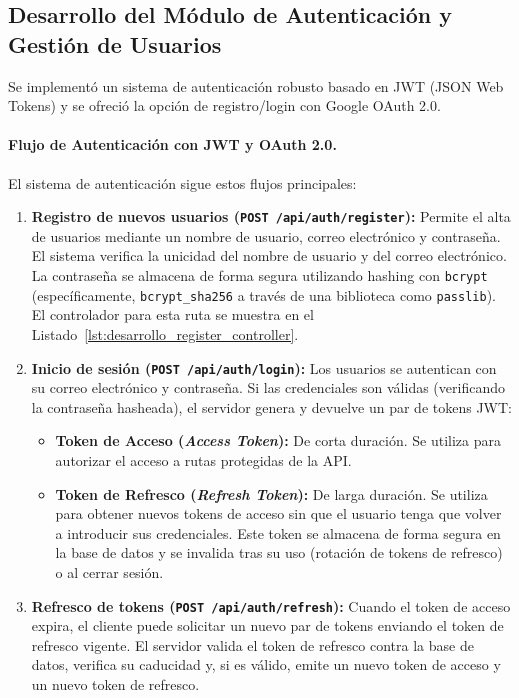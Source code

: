 \subsection{Desarrollo del Módulo de Autenticación y Gestión de Usuarios}
\label{ssec:desarrollo_iter2_auth}

Se implementó un sistema de autenticación robusto basado en JWT (JSON Web Tokens) y se ofreció la opción de registro/login con Google OAuth 2.0.

\paragraph{Flujo de Autenticación con JWT y OAuth 2.0.}
El sistema de autenticación sigue estos flujos principales:
\begin{enumerate}[label=\alph*),leftmargin=*]
  \item \textbf{Registro de nuevos usuarios (\texttt{POST /api/auth/register}):} Permite el alta de usuarios mediante un nombre de usuario, correo electrónico y contraseña. El sistema verifica la unicidad del nombre de usuario y del correo electrónico. La contraseña se almacena de forma segura utilizando hashing con \texttt{bcrypt} (específicamente, \texttt{bcrypt\_sha256} a través de una biblioteca como \texttt{passlib}). El controlador para esta ruta se muestra en el Listado~\ref{lst:desarrollo_register_controller}.

  \item \textbf{Inicio de sesión (\texttt{POST /api/auth/login}):} Los usuarios se autentican con su correo electrónico y contraseña. Si las credenciales son válidas (verificando la contraseña hasheada), el servidor genera y devuelve un par de tokens JWT:
        \begin{itemize}
            \item \textbf{Token de Acceso (\emph{Access Token}):} De corta duración. Se utiliza para autorizar el acceso a rutas protegidas de la API.
            \item \textbf{Token de Refresco (\emph{Refresh Token}):} De larga duración. Se utiliza para obtener nuevos tokens de acceso sin que el usuario tenga que volver a introducir sus credenciales. Este token se almacena de forma segura en la base de datos y se invalida tras su uso (rotación de tokens de refresco) o al cerrar sesión.
        \end{itemize}

  \item \textbf{Refresco de tokens (\texttt{POST /api/auth/refresh}):} Cuando el token de acceso expira, el cliente puede solicitar un nuevo par de tokens enviando el token de refresco vigente. El servidor valida el token de refresco contra la base de datos, verifica su caducidad y, si es válido, emite un nuevo token de acceso y un nuevo token de refresco.


\end{enumerate}
